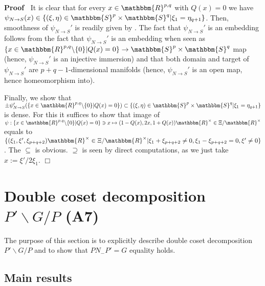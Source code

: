 \documentclass{article}
\newcommand{\assign}{:=}
\renewenvironment{proof}{\noindent\textbf{Proof\ }}{\hspace*{\fill}$\Box$\medskip}
\theoremstyle{remark}
\begin{document}
\begin{proof}
  It is clear that for every $x \in \mathbbm{R}^{p, q}$ with $Q (x) = 0$ we
  have $\psi_{N \rightarrow S} (x) \in \{ (\xi, \eta) \in \mathbbm{S}^p \times
  \mathbbm{S}^q | \xi_1 = \eta_{q + 1} \}$. Then, smoothness of $\psi_{N
  \rightarrow S}'$ is readily given by {\cite[thm.
  1.32]{warner1971foundations}}. The fact that $\psi_{N \rightarrow S}'$ is an
  embedding follows from the fact that $\psi_{N \rightarrow S}'$ is an
  embedding when seen as $\{ x \in \mathbbm{R}^{p, q} \backslash \{ 0 \} | Q
  (x) = 0 \} \rightarrow \mathbbm{S}^p \times \mathbbm{S}^q$ map (hence,
  $\psi_{N \rightarrow S}'$ is an injective immersion) and that both domain
  and target of $\psi_{N \rightarrow S}'$ are $p + q - 1$-dimensional
  manifolds (hence, $\psi_{N \rightarrow S}'$ is an open map, hence
  homeomorphism into).
  
  Finally, we show that $\pm \psi'_{N \rightarrow S} (\{ x \in \mathbbm{R}^{p,
  q} \backslash \{ 0 \} | Q (x) = 0 \}) \subset \{ (\xi, \eta) \in
  \mathbbm{S}^p \times \mathbbm{S}^q | \xi_1 = \eta_{q + 1} \}$ is dense. For
  this it suffices to show that image of $\psi : \{ x \in \mathbbm{R}^{p, q}
  \backslash \{ 0 \} | Q (x) = 0 \} \ni x \mapsto (1 - Q (x), 2 x, 1 + Q (x))
  \mathbbm{R}^{\times} \in \Xi /\mathbbm{R}^{\times}$ equals to $\{ (\xi_1,
  \xi', \xi_{p + q + 2}) \mathbbm{R}^{\times} \in \Xi /\mathbbm{R}^{\times} |
  \xi_1 + \xi_{p + q + 2} \neq 0, \xi_1 - \xi_{p + q + 2} = 0, \xi' \neq 0
  \}$. The $\subseteq$ is obvious. $\supseteq$ is seen by direct computations,
  as we just take $x \assign \xi' / 2 \xi_1$.
\end{proof}

\section{Double coset decomposition $P' \backslash G / P$
(A7)}\label{sec:doublePGP}

The purpose of this section is to explicitly describe double coset
decomposition $P' \backslash G / P$ and to show that $P N_- P' = G$ equality
holds.

\subsection{Main results}
\end{document}
